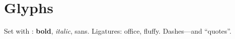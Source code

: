 \documentclass{article}
\begin{document}
\section{Glyphs}
Set with \XeLaTeX: \textbf{bold}, \textit{italic}, \textsf{sans}.
Ligatures: office, fluffy. Dashes---and “quotes”.
\end{document}
